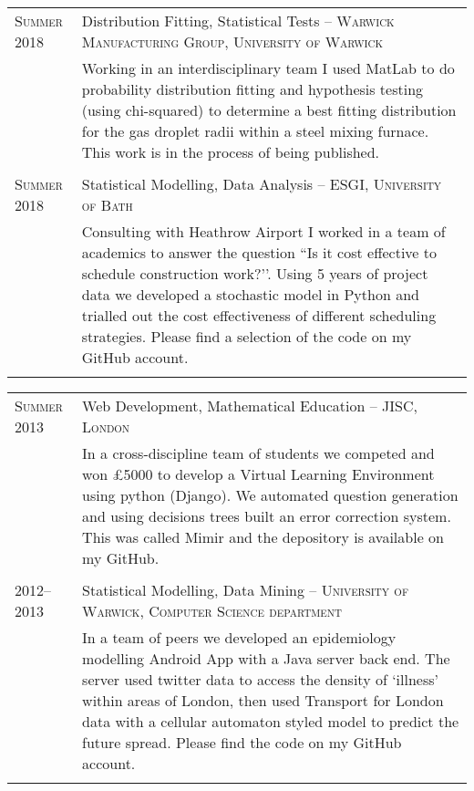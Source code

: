 \documentclass[a4paper,10pt]{article}
\begin{document}
\begin{tabular}{p{2.25cm}|p{15cm}}
	\textsc{Summer 2018}& Distribution Fitting, Statistical Tests -- \textsc{Warwick Manufacturing Group, University of Warwick}\\&\footnotesize{Working in an interdisciplinary team I used MatLab to do probability distribution fitting and hypothesis testing (using chi-squared) to determine a best fitting distribution for the gas droplet radii within a steel mixing furnace. This work is in the process of being published.}\\\multicolumn{2}{c}{} \\
	\textsc{Summer 2018} & Statistical Modelling, Data Analysis -- \textsc{ESGI, University of Bath} \\&\footnotesize{Consulting with Heathrow Airport I worked in a team of academics to answer the question ``Is it cost effective to schedule construction work?’’. Using 5 years of project data we developed a stochastic model in Python and trialled out the cost effectiveness of different scheduling strategies. Please find a selection of the code on my GitHub account.}\\\multicolumn{2}{c}{} \\
\end{tabular}
\begin{tabular}{p{2.25cm}|p{15cm}}
	\textsc{Summer 2013} & Web Development, Mathematical Education -- \textsc{JISC, London} \\&\footnotesize{In a cross-discipline team of students we competed and won £5000 to develop a Virtual Learning Environment using python (Django). We automated question generation and using decisions trees built an error correction system. This was called Mimir and the depository is available on my GitHub.}\\\multicolumn{2}{c}{} \\
	\textsc{2012--2013} & Statistical Modelling, Data Mining -- \textsc{University of Warwick, Computer Science department} \\&\footnotesize{In a team of peers we developed an epidemiology modelling Android App with a Java server back end. The server used twitter data to access the density of `illness' within areas of London, then used Transport for London data with a cellular automaton styled model to predict the future spread. Please find the code on my GitHub account.}\\\multicolumn{2}{c}{}
\end{tabular}
\end{document}
